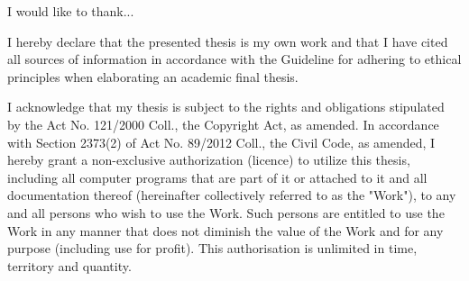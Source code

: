\documentclass[english,bachelor,unicode,oneside,bw]{ctufit-thesis}
\begin{document}
 
\frontmatter\frontmatterinit %


\thispagestyle{empty}\cleardoublepage\maketitle %

\imprintpage %

\tableofcontents %
\listoffigures %
\begingroup
\let\clearpage\relax
\listoftables %
\thectufitlistingscommand
\endgroup

\begin{acknowledgmentpage}
I would like to thank...
\end{acknowledgmentpage}


\begin{declarationpage}
I hereby declare that the presented thesis is my own work and that I have cited all sources of information in accordance with the Guideline for adhering to ethical principles when elaborating an academic final thesis.

I acknowledge that my thesis is subject to the rights and obligations stipulated by the Act No. 121/2000 Coll., the Copyright Act, as amended. In accordance with Section 2373(2) of Act No. 89/2012 Coll., the Civil Code, as amended, I hereby grant a non-exclusive authorization (licence) to utilize this thesis, including all computer programs that are part of it or attached to it and all documentation thereof (hereinafter collectively referred to as the "Work"), to any and all persons who wish to use the Work. Such persons are entitled to use the Work in any manner that does not diminish the value of the Work and for any purpose (including use for profit). This authorisation is unlimited in time, territory and quantity.
\end{declarationpage}
\end{document}
